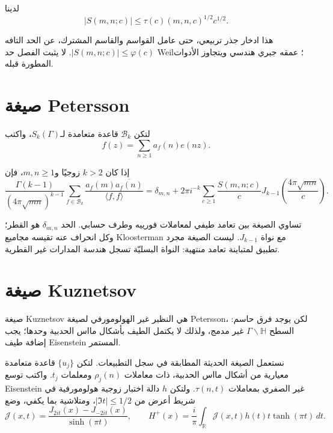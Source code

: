 \begin{theorem}[حد Weil]
\label{thm:weil-kloosterman}
لدينا
\[
|S(m,n;c)|
\le
\tau(c)(m,n,c)^{1/2}c^{1/2}.
\]
\end{theorem}

هذا ادخار جذر تربيعي، حتى عامل القواسم والقاسم المشترك، عن الحد التافه
\(|S(m,n;c)|\le\varphi(c)\). لا يثبت الفصل حد Weil؛ عمقه جبري هندسي
ويتجاوز الأدوات المطورة قبله.

\section{صيغة Petersson}

لتكن \(\mathcal B_k\) قاعدة متعامدة لـ\(S_k(\Gamma)\)، واكتب
\[
f(z)=\sum_{n\ge1}a_f(n)e(nz).
\]

\begin{theorem}
\label{thm:petersson-trace}
إذا كان \(k>2\) زوجيًا و\(m,n\ge1\)، فإن
\[
\frac{\Gamma(k-1)}{(4\pi\sqrt{mn})^{k-1}}
\sum_{f\in\mathcal B_k}
\frac{a_f(m)\overline{a_f(n)}}{\langle f,f\rangle}
=
\delta_{m,n}
+2\pi i^{-k}
\sum_{c\ge1}
\frac{S(m,n;c)}{c}
J_{k-1}\!\left(\frac{4\pi\sqrt{mn}}{c}\right).
\]
\end{theorem}

تساوي الصيغة بين تعامد طيفي لمعاملات فورييه وطرف حسابي. الحد
\(\delta_{m,n}\) هو القطر؛ وكل انحراف عنه تقيسه مجاميع Kloosterman
مع نواة \(J_{k-1}\). ليست الصيغة مجرد تطبيق لمتباينة تعامد منتهية:
النواة البسليّة تسجل هندسة المدارات غير القطرية.

\section{صيغة Kuznetsov}

صيغة Kuznetsov هي النظير غير الهولومورفي لصيغة Petersson، لكن يوجد فرق
حاسم: السطح \(\Gamma\backslash\mathbb H\) غير مدمج، ولذلك لا يكتمل
الطيف بأشكال مااس الحدبية وحدها؛ يجب إضافة طيف Eisenstein المستمر.

نستعمل الصيغة الحديثة المطابقة في سجل التطبيعات. لتكن \(\{u_j\}\)
قاعدة متعامدة معيارية من أشكال مااس الحدبية، ذات معاملات
\(\rho_j(n)\) ومعلمات \(t_j\). واكتب توسع Eisenstein غير الصفري
بمعاملات \(\tau(n,t)\). ولتكن \(h\) دالة اختبار زوجية هولومورفية في
شريط أعرض من \(|\Im t|\le1/2\)، ومتلاشية بما يكفي، وضع
\[
\mathcal J(x,t)
=
\frac{J_{2it}(x)-J_{-2it}(x)}{\sinh(\pi t)},
\qquad
H^+(x)
=
\frac{i}{\pi}\int_{\mathbb R}
\mathcal J(x,t)h(t)t\tanh(\pi t)\,dt.
\]

